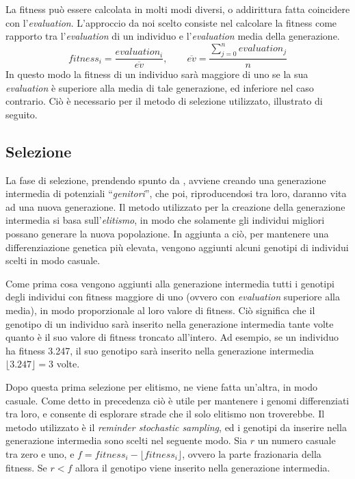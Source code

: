\documentclass[a4paper,12pt]{article}
\begin{document}
La fitness può essere calcolata in molti modi diversi, o addirittura fatta coincidere con l'\emph{evaluation}. L'approccio da noi scelto consiste nel calcolare la fitness come rapporto tra l'\emph{evaluation} di un individuo e l'\emph{evaluation} media della generazione. 
\begin{equation}
	fitness_i = \frac{evaluation_i}{\overline{ev}}, \hspace{2em} \overline{ev} = \frac{\sum_{j = 0}^{n} evaluation_j }{n}
\end{equation}
In questo modo la fitness di un individuo sarà maggiore di uno se la sua \emph{evaluation} è superiore alla media di tale generazione, ed inferiore nel caso contrario. Ciò è necessario per il metodo di selezione utilizzato, illustrato di seguito.
\subsection{Selezione}
La fase di selezione, prendendo spunto da \cite{arztRepo}, avviene creando una generazione intermedia di potenziali ``\emph{genitori}'', che poi, riproducendosi tra loro, daranno vita ad una nuova generazione. Il metodo utilizzato per la creazione della generazione intermedia si basa sull'\emph{elitismo}, in modo che solamente gli individui migliori possano generare la nuova popolazione. In aggiunta a ciò, per mantenere una differenziazione genetica più elevata, vengono aggiunti alcuni genotipi di individui scelti in modo casuale.  

Come prima cosa vengono aggiunti alla generazione intermedia tutti i genotipi degli individui con fitness maggiore di uno (ovvero con \emph{evaluation} superiore alla media), in modo proporzionale al loro valore di fitness. Ciò significa che il genotipo di un individuo sarà inserito nella generazione intermedia tante volte quanto è il suo valore di fitness troncato all'intero. Ad esempio, se un individuo ha fitness 3.247, il suo genotipo sarà inserito nella generazione intermedia $\lfloor3.247\rfloor = 3$ volte. 

Dopo questa prima selezione per elitismo, ne viene fatta un'altra, in modo casuale. Come detto in precedenza ciò è utile per mantenere i genomi differenziati tra loro, e consente di esplorare strade che il solo elitismo non troverebbe. Il metodo utilizzato è il \emph{reminder stochastic sampling}, ed i genotipi da inserire nella generazione intermedia sono scelti nel seguente modo. Sia $r$ un numero casuale tra zero e uno, e $f = fitness_i - \lfloor fitness_i \rfloor$, ovvero la parte frazionaria della fitness. Se $r < f$ allora il genotipo viene inserito nella generazione intermedia.
\end{document}
